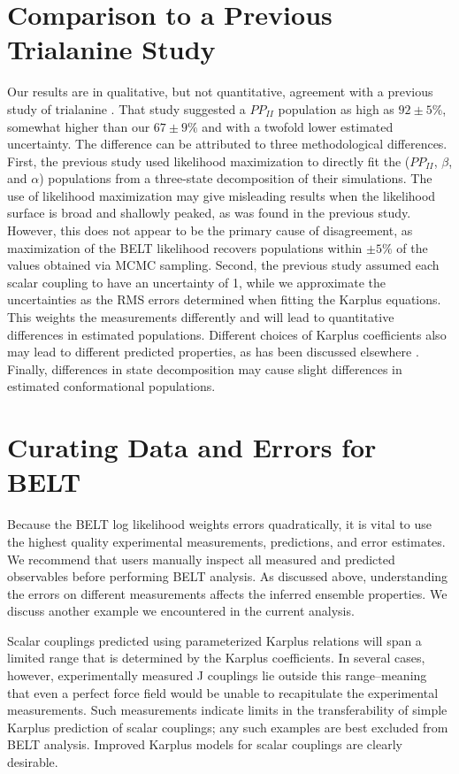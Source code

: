 \documentclass[journal=jacsat,manuscript=article]{achemso}
\begin{document}
\section*{Comparison to a Previous Trialanine Study}

Our results are in qualitative, but not quantitative, agreement with a previous study of trialanine \cite{Graf2007}.  That study suggested a $PP_{II}$ population as high as $92 \pm 5\%$, somewhat higher than our $67 \pm 9 \%$ and with a twofold lower estimated uncertainty.  The difference can be attributed to three methodological differences.  First, the previous study used likelihood maximization to directly fit the ($PP_{II}$, $\beta$, and $\alpha$) populations from a three-state decomposition of their simulations.  The use of likelihood maximization may give misleading results when the likelihood surface is broad and shallowly peaked, as was found in the previous study.  However, this does not appear to be the primary cause of disagreement, as maximization of the BELT likelihood recovers populations within $\pm 5\%$ of the values obtained via MCMC sampling.  Second, the previous study assumed each scalar coupling to have an uncertainty of 1, while we approximate the uncertainties as the RMS errors 
determined when fitting the Karplus equations.  This weights the measurements differently and will lead to quantitative differences in estimated populations.  Different choices of Karplus coefficients also may lead to different predicted properties, as has been discussed elsewhere \cite{markwick2009structural}.    Finally, differences in state decomposition may cause slight differences in estimated conformational populations.  


\section*{Curating Data and Errors for BELT}

Because the BELT log likelihood weights errors quadratically, it is vital to use the highest quality experimental measurements, predictions, and error estimates.  We recommend that users manually inspect all measured and predicted observables before performing BELT analysis.  As discussed above, understanding the errors on different measurements affects the inferred ensemble properties.  We discuss another example we encountered in the current analysis.  

Scalar couplings predicted using parameterized Karplus relations will span a limited range that is determined by the Karplus coefficients.  In several cases, however, experimentally measured J couplings lie outside this range--meaning that even a perfect force field would be unable to recapitulate the experimental measurements.  Such measurements indicate limits in the transferability of simple Karplus prediction of scalar couplings; any such examples are best excluded from BELT analysis.  Improved  Karplus models for scalar couplings are clearly desirable.  
\end{document}
